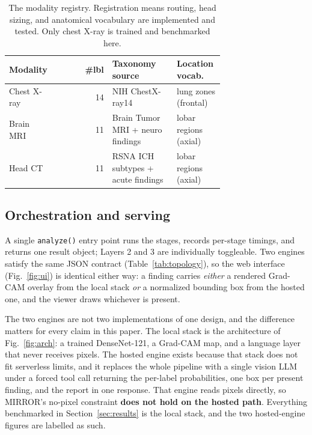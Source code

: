 \documentclass[conference]{IEEEtran}
\newcommand{\code}[1]{\texttt{\small #1}}
\begin{document}
\begin{table}[tbp]
\centering
\caption{The modality registry. Registration means routing, head sizing, and
anatomical vocabulary are implemented and tested. Only chest X-ray is trained and
benchmarked here.}
\label{tab:modalities}
\footnotesize
\begin{tabular}{@{}p{0.19\linewidth}r%
>{\raggedright\arraybackslash}p{0.30\linewidth}%
>{\raggedright\arraybackslash}p{0.22\linewidth}@{}}
\toprule
\textbf{Modality} & \textbf{\#lbl} & \textbf{Taxonomy source} & \textbf{Location vocab.} \\
\midrule
Chest X-ray & 14 & NIH ChestX-ray14 & lung zones (frontal) \\
Brain MRI   & 11 & Brain Tumor MRI + neuro findings & lobar regions (axial) \\
Head CT     & 11 & RSNA ICH subtypes + acute findings & lobar regions (axial) \\
\bottomrule
\end{tabular}
\end{table}

\subsection{Orchestration and serving}
\label{sec:serving}
A single \code{analyze()} entry point runs the stages, records per-stage timings,
and returns one result object; Layers 2 and 3 are individually toggleable. Two
engines satisfy the same JSON contract (Table~\ref{tab:topology}), so the web
interface (Fig.~\ref{fig:ui}) is identical either way: a finding carries
\emph{either} a rendered Grad-CAM overlay from the local stack \emph{or} a
normalized bounding box from the hosted one, and the viewer draws whichever is
present.

The two engines are not two implementations of one design, and the difference
matters for every claim in this paper. The local stack is the architecture of
Fig.~\ref{fig:arch}: a trained DenseNet-121, a Grad-CAM map, and a language layer
that never receives pixels. The hosted engine exists because that stack does not
fit serverless limits, and it replaces the whole pipeline with a single vision LLM
under a forced tool call returning the per-label probabilities, one box per present
finding, and the report in one response. That engine reads pixels directly, so
MIRROR's no-pixel constraint \textbf{does not hold on the hosted path}. Everything
benchmarked in Section~\ref{sec:results} is the local stack, and the two
hosted-engine figures are labelled as such.
\end{document}
